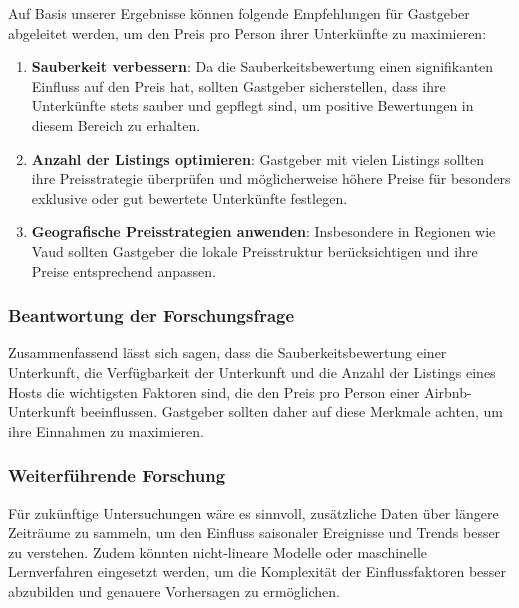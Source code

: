 \documentclass[
  journal,
]{IEEEtran}%
\begin{document}
Auf Basis unserer Ergebnisse können folgende Empfehlungen für Gastgeber
abgeleitet werden, um den Preis pro Person ihrer Unterkünfte zu
maximieren:

\begin{enumerate}
\def\labelenumi{\arabic{enumi}.}
\item
  \textbf{Sauberkeit verbessern}: Da die Sauberkeitsbewertung einen
  signifikanten Einfluss auf den Preis hat, sollten Gastgeber
  sicherstellen, dass ihre Unterkünfte stets sauber und gepflegt sind,
  um positive Bewertungen in diesem Bereich zu erhalten.
\item
  \textbf{Anzahl der Listings optimieren}: Gastgeber mit vielen Listings
  sollten ihre Preisstrategie überprüfen und möglicherweise höhere
  Preise für besonders exklusive oder gut bewertete Unterkünfte
  festlegen.
\item
  \textbf{Geografische Preisstrategien anwenden}: Insbesondere in
  Regionen wie Vaud sollten Gastgeber die lokale Preisstruktur
  berücksichtigen und ihre Preise entsprechend anpassen.
\end{enumerate}

\hypertarget{beantwortung-der-forschungsfrage}{%
\subsubsection{Beantwortung der
Forschungsfrage}\label{beantwortung-der-forschungsfrage}}

Zusammenfassend lässt sich sagen, dass die Sauberkeitsbewertung einer
Unterkunft, die Verfügbarkeit der Unterkunft und die Anzahl der Listings
eines Hosts die wichtigsten Faktoren sind, die den Preis pro Person
einer Airbnb-Unterkunft beeinflussen. Gastgeber sollten daher auf diese
Merkmale achten, um ihre Einnahmen zu maximieren.

\hypertarget{weiterfuxfchrende-forschung}{%
\subsubsection{Weiterführende
Forschung}\label{weiterfuxfchrende-forschung}}

Für zukünftige Untersuchungen wäre es sinnvoll, zusätzliche Daten über
längere Zeiträume zu sammeln, um den Einfluss saisonaler Ereignisse und
Trends besser zu verstehen. Zudem könnten nicht-lineare Modelle oder
maschinelle Lernverfahren eingesetzt werden, um die Komplexität der
Einflussfaktoren besser abzubilden und genauere Vorhersagen zu
ermöglichen.
\end{document}
